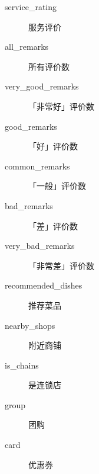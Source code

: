 \documentclass[11pt]{article}
\begin{document}
\begin{itemize}
\begin{description}
\item[{service\_rating}] 服务评价
\item[{all\_remarks}] 所有评价数
\item[{very\_good\_remarks}] 「非常好」评价数
\item[{good\_remarks}] 「好」评价数
\item[{common\_remarks}] 「一般」评价数
\item[{bad\_remarks}] 「差」评价数
\item[{very\_bad\_remarks}] 「非常差」评价数
\item[{recommended\_dishes}] 推荐菜品
\item[{nearby\_shops}] 附近商铺
\item[{is\_chains}] 是连锁店
\item[{group}] 团购
\item[{card}] 优惠券
\end{description}
\end{itemize}
\end{document}
